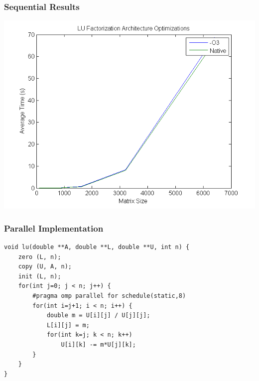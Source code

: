 \documentclass{beamer}
\begin{document}
\begin{frame}
\frametitle{Sequential Results}

\begin{center}
\includegraphics[scale=0.5]{figures/fig4}
\end{center}

\end{frame}

\begin{frame}[fragile]
\frametitle{Parallel Implementation}

\begin{lstlisting}
void lu(double **A, double **L, double **U, int n) {
    zero (L, n);
    copy (U, A, n);
    init (L, n);
    for(int j=0; j < n; j++) {
        #pragma omp parallel for schedule(static,8)  
        for(int i=j+1; i < n; i++) {
            double m = U[i][j] / U[j][j];
            L[i][j] = m;
            for(int k=j; k < n; k++)
                U[i][k] -= m*U[j][k];
        }
    }
}
\end{lstlisting}

\end{frame}
\end{document}
